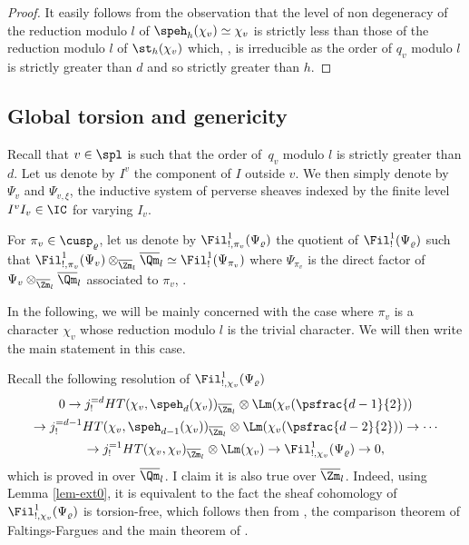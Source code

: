 \begin{proof}
It easily follows from the observation that the level of non degeneracy of
the reduction modulo $l$ of $\speh_h(\chi_v) \simeq \chi_v$ is strictly less than
those of the reduction modulo $l$ of $\st_h(\chi_v)$ which, \cf \cite{boyer-repmodl},
is irreducible as the order
of $q_v$ modulo $l$ is strictly greater than $d$ and so strictly greater than $h$.
\end{proof}

\subsection{Global torsion and genericity}
\label{para-generic}

Recall that $v \in \spl$ is such that the order of~$q_v$ modulo $l$ is strictly
greater than $d$. Let us denote by $I^{v}$ the component of $I$ outside $v$.
We then simply denote by $\Psi_v$ and $\Psi_{v,\xi}$,
the inductive system of perverse sheaves indexed by the finite level $I^{v} I_v \in \IC$
for varying $I_v$.

For $\pi_{v} \in \cusp_\varrho$, let us denote by $\Fil^1_{!,\pi_{v}}(\Psi_\varrho)$ the quotient of $\Fil^1_!(\Psi_\varrho)$ such that
$\Fil^1_{!,\pi_{v}}(\Psi_v) \otimes_{\overline \Zm_l} \overline \Qm_l \simeq \Fil^1_!(\Psi_{\pi_{v}})$
where $\Psi_{\pi_{v}}$ is the direct factor of $\Psi_v \otimes_{\overline \Zm_l} \overline \Qm_l$
associated to $\pi_{v}$, \cf \cite{boyer-torsion}.

\begin{remark}
In the following, we will be mainly concerned with the case where $\pi_v$
is a character $\chi_v$ whose reduction modulo $l$ is the trivial character.
We will then write the main statement in this case.
\end{remark}

Recall the following resolution of $\Fil^1_{!,\chi_{v}}(\Psi_\varrho)$
\begin{multline} \label{eq-resolution-psi0}
0 \to j^{=d}_! HT(\chi_{v},\speh_d(\chi_{v}))_{\overline \Zm_l} \otimes \Lm (\chi_{v}(\psfrac{d-1}{2}))\\
\to j^{=d-1}_!HT(\chi_{v},\speh_{d-1}(\chi_{v}))_{\overline \Zm_l} \otimes \Lm (\chi_{v}(\psfrac{d-2}{2}))
\to \cdots \\ \to j^{=1}_! HT(\chi_{v},\chi_{v})_{\overline \Zm_l} \otimes \Lm(\chi_{v})
\to \Fil^1_{!,\chi_{v}}(\Psi_\varrho) \to 0,
\end{multline}
which is proved in \cite{boyer-torsion} over $\overline \Qm_l$. I claim it is
also true over $\overline \Zm_l$. Indeed, using Lemma \ref{lem-ext0},
it is equivalent to the fact the sheaf cohomology of $\Fil^1_{!,\chi_{v}}(\Psi_\varrho)$
is torsion-free, which follows then from \cite{s-s}, the comparison
theorem of Faltings-Fargues \cf \cite{fargues-faltings} and the main theorem
of \cite{fargues-monodromie}.

